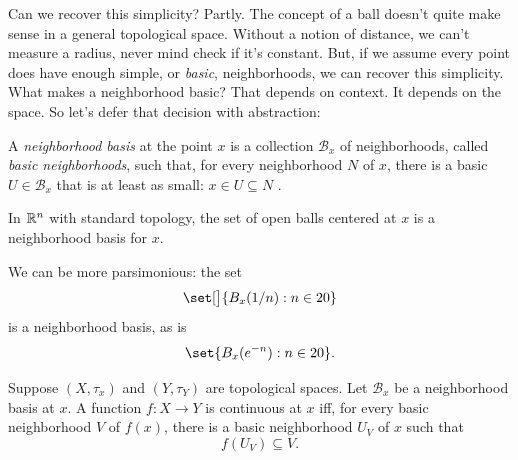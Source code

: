 \documentclass[a5paper]{scrbook}
\def\nhoodbase{{\mathcal {B}}}
\def\ball{B}
\begin{document}
  Can we recover this simplicity? Partly. The concept of a ball doesn't quite make sense in a general topological space. Without a notion of distance, we can't measure a radius, never mind check if it's constant. But, if we assume every point does have enough simple, or \emph{basic}, neighborhoods, we can recover this simplicity.  What makes a neighborhood basic? That depends on context. It depends on the space. So let's defer that decision with abstraction: 
  \begin{defn}
    A \emph{neighborhood basis} at the point \(x\) is a collection \(\nhoodbase_x\) of neighborhoods, called \emph{basic neighborhoods}, such that, for every neighborhood \(N\) of \(x\), there is a basic \(U\in\nhoodbase_x\) that is at least as small: \(x\in U\subseteq N\) \cite[32]{willard}. 
    \[
      
    \]
  \end{defn}
  \begin{example}
    In \(\mathbb{R}^n\) with standard topology, the set of open balls centered at \(x\) is a neighborhood basis for \(x\).

    We can be more parsimonious: the set
    \[
      \set[\big]{\ball_x(1/n) : n\in\N}
    \]
    is a neighborhood basis, as is
    \[
      \set{\ball_x(e^{-n}) : n \in \N }. 
    \]
  \end{example}
  \begin{defn}\sloppypar
    Suppose \((X,\tau_x)\) and \((Y,\tau_Y)\) are topological spaces. Let \(\nhoodbase_x\) be a neighborhood basis at \(x\). 
    A function \(f:X\to Y\) is continuous at \(x\) iff, for every basic neighborhood \(V\) of \(f(x)\), there is a basic neighborhood \(U_V\) of \(x\) such that
    \[
      f(U_V)\subseteq V. 
    \]
  \end{defn}
  
\end{document}
